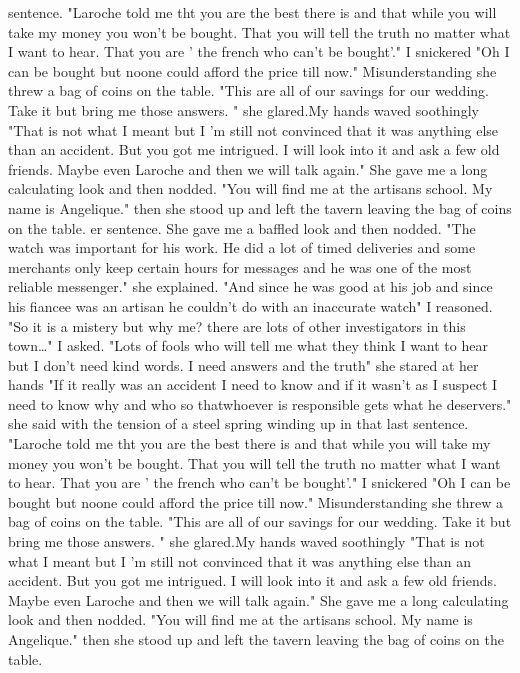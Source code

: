 sentence. "Laroche told me tht you are the best there is and that while you will take my money you won't be bought. That you will tell the truth no matter what I want to hear. That you are ' the french who can't be bought'." I snickered "Oh I can be bought but noone could afford the price till now." Misunderstanding she threw a bag of coins on the table. "This are all of our savings for our wedding. Take it but bring me those answers. " she glared.My hands waved soothingly "That is not what I meant but I 'm still not convinced that it was anything else than an accident. But you got me intrigued. I will look into it and ask a few old friends. Maybe even Laroche and then we will talk again." She gave me a long calculating look and then nodded. "You will find me at the artisans school. My name is Angelique." then she stood up and left the tavern leaving the bag of coins on the table.
er sentence. She gave me a baffled look and then nodded. "The watch was important for his work. He did a lot of timed deliveries and some merchants only keep certain hours for messages and he was one of the most reliable messenger." she explained. "And since he was good at his job and since his fiancee was an artisan he couldn't do with an inaccurate watch" I reasoned. "So it is a mistery but why me? there are lots of other investigators in this town\dots" I asked. "Lots of fools who will tell me what they think I want to hear but I don't need kind words. I need answers and the truth" she stared at her hands "If it really was an accident I need to know and if it wasn't as I suspect I need to know why and who so thatwhoever is responsible gets what he deservers." she said with the tension of a steel spring winding up in that last sentence. "Laroche told me tht you are the best there is and that while you will take my money you won't be bought. That you will tell the truth no matter what I want to hear. That you are ' the french who can't be bought'." I snickered "Oh I can be bought but noone could afford the price till now." Misunderstanding she threw a bag of coins on the table. "This are all of our savings for our wedding. Take it but bring me those answers. " she glared.My hands waved soothingly "That is not what I meant but I 'm still not convinced that it was anything else than an accident. But you got me intrigued. I will look into it and ask a few old friends. Maybe even Laroche and then we will talk again." She gave me a long calculating look and then nodded. "You will find me at the artisans school. My name is Angelique." then she stood up and left the tavern leaving the bag of coins on the table.

